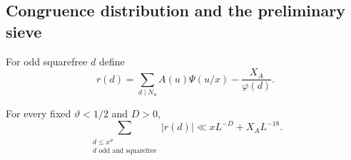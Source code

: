 \subsection{Congruence distribution and the preliminary sieve}

For odd squarefree $d$ define
\[
 r(d)=\sum_{d\mid N_u}A(u)\Psi(u/x)-\frac{X_A}{\varphi(d)}.
\]
\begin{proposition}\label{prop:typeI}
For every fixed $\vartheta<1/2$ and $D>0$,
\begin{equation}\label{eq:typeI-bound}
 \sum_{\substack{d\le x^\vartheta\\d\text{ odd and squarefree}}}
 |r(d)|\ll xL^{-D}+X_AL^{-18}.
\end{equation}
\end{proposition}


